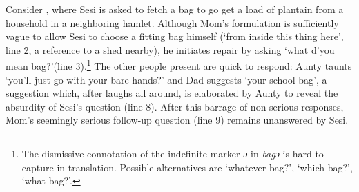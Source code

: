 \documentclass[output=paper]{langsci/langscibook}
\begin{document}
Consider , where Sesi is asked to fetch a bag to go get a load of plantain from a household in a neighboring hamlet. Although Mom’s formulation is sufficiently vague to allow Sesi to choose a fitting bag himself (‘from inside this thing here’, line 2, a reference to a shed nearby), he initiates repair by asking ‘what d’you mean bag?’(line 3).\footnote{The dismissive connotation of the indefinite marker \textit{ɔ} in \textit{bagɔ} is hard to capture in translation. Possible alternatives are ‘whatever bag?’, ‘which bag?’, ‘what bag?’.} The other people present are quick to respond: Aunty taunts ‘you’ll just go with your bare hands?’ and Dad suggests ‘your school bag’, a suggestion which, after laughs all around, is elaborated by Aunty to reveal the absurdity of Sesi’s question (line 8). After this barrage of non-serious responses, Mom’s seemingly serious follow-up question (line 9) remains unanswered by Sesi.
\end{document}
